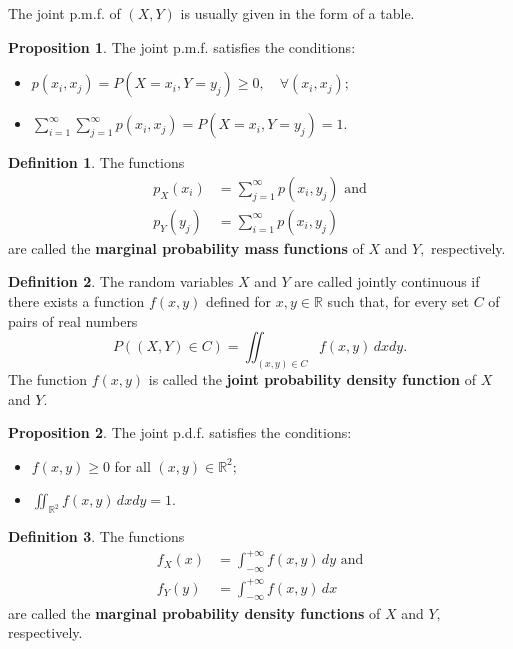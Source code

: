 \documentclass[12pt, a4paper]{article}
\newcommand{\bb}[1]{\mathbb{#1}}
\theoremstyle{definition}
\newtheorem{definition}{Definition}[section]
\newtheorem{proposition}{Proposition}
\theoremstyle{plain}
\begin{document}
The joint p.m.f. of $(X , Y )$ is usually given in the form of a table.

\begin{proposition}
The joint p.m.f. satisfies the conditions:
\begin{itemize}

	\item $p(x_i,x_j)=P(X=x_i,Y=y_j)\geq 0, \quad \forall{(x_i,x_j)};$

	\item $\sum_{i=1}^{\infty}\sum_{j=1}^{\infty}p(x_i,x_j)=P(X=x_i,Y=y_j)=1.$

\end{itemize}
\end{proposition}

\begin{definition}
The functions $$\begin{aligned}
p_X(x_i)&= \sum_{j=1}^{\infty}p(x_i,y_j)  \text{ and}\\ p_Y(y_j)&=\sum_{i=1}^{\infty}p(x_i,y_j)
\end{aligned}$$ are called the \textbf{marginal probability mass functions} of $X$ and $Y ,$ respectively.
\end{definition}

\begin{definition}
The random variables $X$ and $Y$ are called jointly continuous if there exists a function $f (x , y )$ defined for $x , y \in \bb{R}$ such that, for every set $C$ of pairs of real numbers $$P((X,Y)\in C) = \iint_{(x,y)\in C}f(x,y) \, dxdy.$$ The function $f(x,y)$ is called the \textbf{joint probability density function} of $X$ and $Y .$
\end{definition}

\begin{proposition}
The joint p.d.f. satisfies the conditions: \begin{itemize}

	\item $f(x,y)\geq 0$ for all $(x,y)\in \bb{R}^2;$
	\item $\iint_{\bb{R}^2}f(x,y)\,dxdy=1.$
\end{itemize}
\end{proposition}

\begin{definition}
The functions $$\begin{aligned}
f_X(x)&=\int_{-\infty}^{+\infty} f(x,y) \,dy \text{ and}\\ 
f_Y(y)&=\int_{-\infty}^{+\infty} f(x,y)\,dx
\end{aligned}$$ are called the \textbf{ marginal probability density functions} of $X$ and $Y ,$ respectively.
\end{definition}
\end{document}

